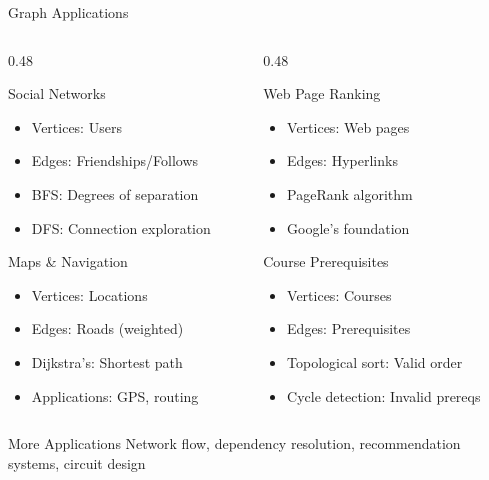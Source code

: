 \documentclass[aspectratio=169,xcolor=dvipsnames]{beamer}
\begin{document}
\begin{frame}{Graph Applications}
  \begin{columns}
    \begin{column}{0.48\textwidth}
      \begin{block}{Social Networks}
        \begin{itemize}
          \item Vertices: Users
          \item Edges: Friendships/Follows
          \item BFS: Degrees of separation
          \item DFS: Connection exploration
        \end{itemize}
      \end{block}

      \begin{block}{Maps \& Navigation}
        \begin{itemize}
          \item Vertices: Locations
          \item Edges: Roads (weighted)
          \item Dijkstra's: Shortest path
          \item Applications: GPS, routing
        \end{itemize}
      \end{block}
    \end{column}
    \begin{column}{0.48\textwidth}
      \begin{block}{Web Page Ranking}
        \begin{itemize}
          \item Vertices: Web pages
          \item Edges: Hyperlinks
          \item PageRank algorithm
          \item Google's foundation
        \end{itemize}
      \end{block}

      \begin{block}{Course Prerequisites}
        \begin{itemize}
          \item Vertices: Courses
          \item Edges: Prerequisites
          \item Topological sort: Valid order
          \item Cycle detection: Invalid prereqs
        \end{itemize}
      \end{block}
    \end{column}
  \end{columns}

  \vspace{0.3cm}

  \begin{exampleblock}{More Applications}
    Network flow, dependency resolution, recommendation systems, circuit design
  \end{exampleblock}
\end{frame}
\end{document}
